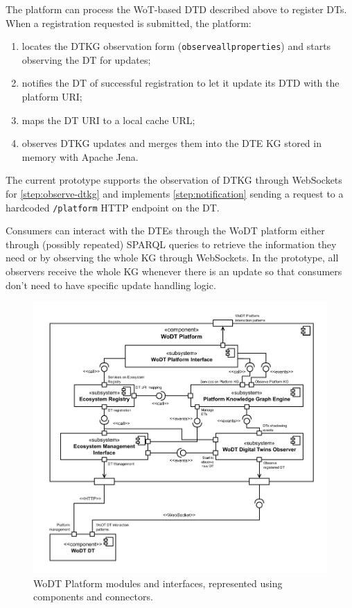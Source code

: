 The platform can process the \ac{WoT}-based \ac{DTD} described above to register \acp{DT}.
When a registration requested is submitted, the platform:
\begin{enumerate}[label=\textbf{Step \arabic*}, leftmargin=5.3em]
    \item locates the \ac{DTKG} observation form (\texttt{observeallproperties}) and starts observing the \ac{DT} for updates;\label{step:observe-dtkg}
    \item notifies the \ac{DT} of successful registration to let it update its \ac{DTD} with the platform URI;\label{step:notification}
    \item maps the \ac{DT} \ac{URI} to a local cache URL;
    \item observes \ac{DTKG} updates and merges them into the \ac{DTE} \ac{KG} stored in memory with Apache Jena.
\end{enumerate}

%
The current prototype supports the observation of \ac{DTKG} through WebSockets for \ref{step:observe-dtkg} and implements \ref{step:notification} sending a request to a hardcoded \texttt{/platform} HTTP endpoint on the \ac{DT}.

Consumers can interact with the \acp{DTE} through the \ac{WoDT} platform
either through (possibly repeated) SPARQL queries to retrieve the information they need or by observing the whole \ac{KG} through WebSockets.
%
In the prototype, all observers receive the whole \ac{KG} whenever there is an update so that consumers don't need to have specific update handling logic.
%

\begin{figure}
  \centering
  \includegraphics[width=\columnwidth]{figures/hwodt/platform-c&c.pdf}
  \caption{\ac{WoDT} Platform modules and interfaces, represented using components and connectors.}
  \label{fig:platform-c&c}
\end{figure}
